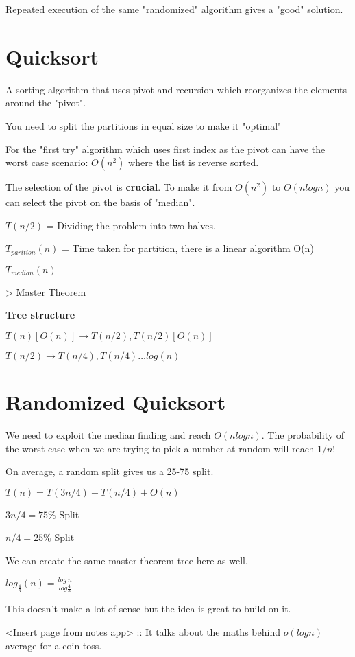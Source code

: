 \documentclass{article}
\begin{document}
Repeated execution of the same "randomized" algorithm gives a "good" solution.

\section{Quicksort}

A sorting algorithm that uses pivot and recursion which reorganizes the elements around the "pivot".

You need to split the partitions in equal size to make it "optimal"

For the "first try" algorithm which uses first index as the pivot can have the worst case scenario: $O(n^2)$ where the list is reverse sorted.

The selection of the pivot is \textbf{crucial}. To make it from $O(n^2)$ to $O(nlogn)$ you can select the pivot on the basis of "median".

$T(n/2)$ = Dividing the problem into two halves.

$T_{parition}(n)$ = Time taken for partition, there is a linear algorithm O(n)

$T_{median}(n)$

> Master Theorem 

\textbf{Tree structure} 

$T(n) [O(n)] \rightarrow T(n/2), T(n/2) [O(n)]$

$T(n/2) \rightarrow T(n/4), T(n/4) \ldots log(n)$

\section{Randomized Quicksort}

We need to exploit the median finding and reach $O(nlogn)$. The probability of the worst case when we are trying to pick a number at random will reach $1/n!$

On average, a random split gives us a 25-75 split.

$T(n) = T(3n/4) + T(n/4) + O(n)$

$3n/4 = 75\%$ Split

$n/4 = 25\%$ Split

We can create the same master theorem tree here as well.

$log_{\frac{4}{3}}(n) = \frac{log \: n}{log \frac{4}{3}}$

This doesn't make a lot of sense but the idea is great to build on it.

<Insert page from notes app> :: It talks about the maths behind $o(log n)$ average for a coin toss.
\end{document}
